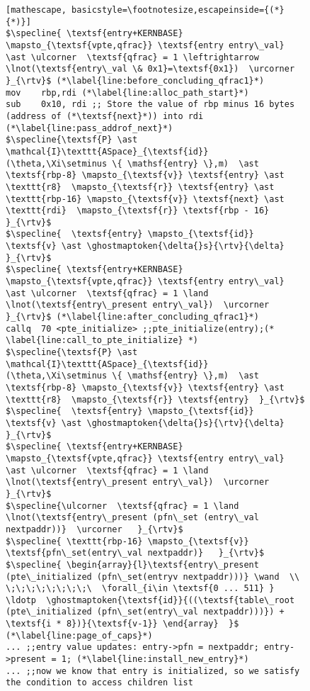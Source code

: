 \begin{figure}
\begin{lstlisting}[mathescape, basicstyle=\footnotesize,escapeinside={(*}{*)}]
$\specline{ \textsf{entry+KERNBASE} \mapsto_{\textsf{vpte,qfrac}} \textsf{entry entry\_val} \ast \ulcorner  \textsf{qfrac} = 1 \leftrightarrow  \lnot(\textsf{entry\_val \& 0x1}=\textsf{0x1})  \urcorner }_{\rtv}$ (*\label{line:before_concluding_qfrac1}*)
mov    rbp,rdi (*\label{line:alloc_path_start}*)
sub    0x10, rdi ;; Store the value of rbp minus 16 bytes (address of (*\textsf{next}*)) into rdi (*\label{line:pass_addrof_next}*)
$\specline{\textsf{P} \ast \mathcal{I}\texttt{ASpace}_{\textsf{id}}(\theta,\Xi\setminus \{ \mathsf{entry} \},m)  \ast \textsf{rbp-8} \mapsto_{\textsf{v}} \textsf{entry} \ast \texttt{r8}  \mapsto_{\textsf{r}} \textsf{entry} \ast \texttt{rbp-16} \mapsto_{\textsf{v}} \textsf{next} \ast \texttt{rdi}  \mapsto_{\textsf{r}} \textsf{rbp - 16} }_{\rtv}$
$\specline{  \textsf{entry} \mapsto_{\textsf{id}} \textsf{v} \ast \ghostmaptoken{\delta{}s}{\rtv}{\delta} }_{\rtv}$
$\specline{ \textsf{entry+KERNBASE} \mapsto_{\textsf{vpte,qfrac}} \textsf{entry entry\_val} \ast \ulcorner  \textsf{qfrac} = 1 \land \lnot(\textsf{entry\_present entry\_val})  \urcorner }_{\rtv}$ (*\label{line:after_concluding_qfrac1}*)
callq  70 <pte_initialize> ;;pte_initialize(entry);(* \label{line:call_to_pte_initialize} *)
$\specline{\textsf{P} \ast \mathcal{I}\texttt{ASpace}_{\textsf{id}}(\theta,\Xi\setminus \{ \mathsf{entry} \},m)  \ast \textsf{rbp-8} \mapsto_{\textsf{v}} \textsf{entry} \ast \texttt{r8}  \mapsto_{\textsf{r}} \textsf{entry}  }_{\rtv}$
$\specline{  \textsf{entry} \mapsto_{\textsf{id}} \textsf{v} \ast \ghostmaptoken{\delta{}s}{\rtv}{\delta} }_{\rtv}$
$\specline{ \textsf{entry+KERNBASE} \mapsto_{\textsf{vpte,qfrac}} \textsf{entry entry\_val} \ast \ulcorner  \textsf{qfrac} = 1 \land \lnot(\textsf{entry\_present entry\_val})  \urcorner }_{\rtv}$
$\specline{\ulcorner  \textsf{qfrac} = 1 \land \lnot(\textsf{entry\_present (pfn\_set (entry\_val nextpaddr))}  \urcorner   }_{\rtv}$
$\specline{ \texttt{rbp-16} \mapsto_{\textsf{v}} \textsf{pfn\_set(entry\_val nextpaddr)}   }_{\rtv}$
$\specline{ \begin{array}{l}\textsf{entry\_present (pte\_initialized (pfn\_set(entryv nextpaddr)))} \wand  \\ \;\;\;\;\;\;\;\;\  \forall_{i\in \textsf{0 ... 511} } \ldotp  \ghostmaptoken{\textsf{id}}{((\textsf{table\_root (pte\_initialized (pfn\_set(entry\_val nextpaddr)))}) + \textsf{i * 8})}{\textsf{v-1}} \end{array}  }$ (*\label{line:page_of_caps}*)
... ;;entry value updates: entry->pfn = nextpaddr; entry->present = 1; (*\label{line:install_new_entry}*)
... ;;now we know that entry is initialized, so we satisfy the condition to access children list

\end{lstlisting}
\end{figure}
